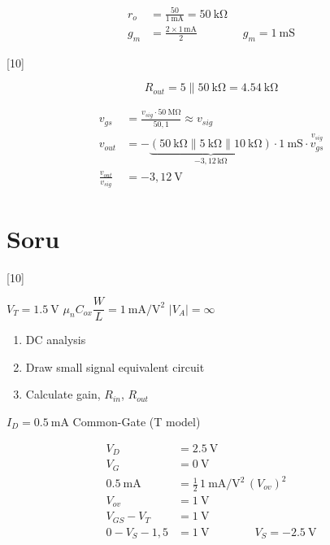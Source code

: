 \documentclass[11pt,a4paper]{article}
\begin{document}
\begin{align*}
  r_o &= \frac{50}{1\,\mathrm{mA}} = \qty{50}{\kilo\ohm} \\
  g_m &= \frac{2 \times 1\,\mathrm{mA}}{2} \qquad\qquad g_m = \qty{1}{\milli\siemens}
\end{align*}

[10]

\[ R_{out} = 5 \parallel \qty{50}{\kilo\ohm} = \qty{4,54}{\kilo\ohm} \]

\begin{align*}
  v_{gs} &= \frac{v_{sig}\cdot \qty{50}{\mega\ohm}}{50{,}1} \approx v_{sig} \\
  v_{out} &= -\underbrace{(\qty{50}{\kilo\ohm} \parallel \qty{5}{\kilo\ohm} \parallel \qty{10}{\kilo\ohm})}_{-3{,}12\,\mathrm{k\Omega}} \cdot \qty{1}{\milli\siemens} \cdot \overset{v_{sig}}{v_{gs}} \\
  \frac{v_{out}}{v_{sig}} &= -3{,}12\ \mathrm{V}
\end{align*}

\section{Soru}
[10]

\begin{ornek}
  $V_T = \qty{1,5}{\volt}$ \qquad $\mu_n C_{ox}\dfrac{W}{L} = \qty{1}{\milli\ampere\per\volt\squared}$ \qquad $|V_A| = \infty$
  \begin{enumerate}[label=\alph*)]
    \item DC analysis
    \item Draw small signal equivalent circuit
    \item Calculate gain, $R_{in}$, $R_{out}$
  \end{enumerate}
\end{ornek}

\noindent $I_D = \qty{0,5}{\milli\ampere}$ \qquad\qquad Common-Gate (T model)

\begin{align*}
  V_D &= \qty{2,5}{\volt} \\
  V_G &= \qty{0}{\volt} \\
  \qty{0,5}{\milli\ampere} &= \tfrac{1}{2}\,\qty{1}{\milli\ampere\per\volt\squared}\,(V_{ov})^2 \\
  V_{ov} &= \qty{1}{\volt} \\
  V_{GS} - V_T &= \qty{1}{\volt} \\
  0 - V_S - 1{,}5 &= \qty{1}{\volt} \qquad\qquad V_S = -\qty{2,5}{\volt}
\end{align*}
\end{document}
